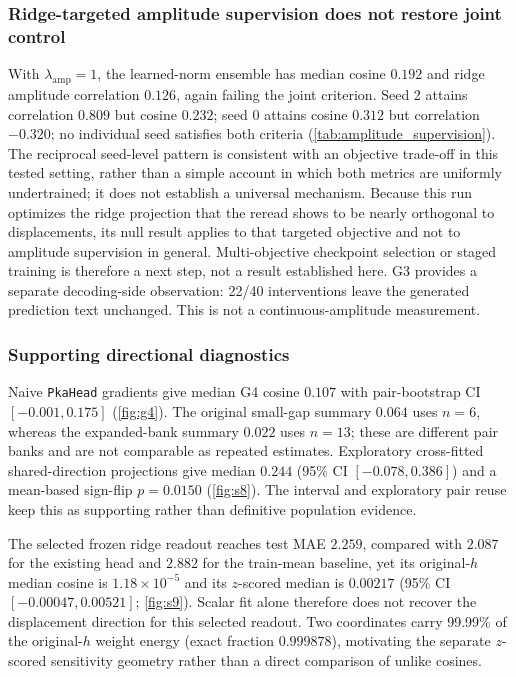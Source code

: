 \documentclass[11pt]{article}
\begin{document}
\subsubsection{Ridge-targeted amplitude supervision does not restore joint control} With $\lambda_{\mathrm{amp}}=1$, the learned-norm ensemble has median cosine $0.192$ and ridge amplitude correlation $0.126$, again failing the joint criterion. Seed 2 attains correlation $0.809$ but cosine $0.232$; seed 0 attains cosine $0.312$ but correlation $-0.320$; no individual seed satisfies both criteria (\cref{tab:amplitude_supervision}). The reciprocal seed-level pattern is consistent with an objective trade-off in this tested setting, rather than a simple account in which both metrics are uniformly undertrained; it does not establish a universal mechanism. Because this run optimizes the ridge projection that the reread shows to be nearly orthogonal to displacements, its null result applies to that targeted objective and not to amplitude supervision in general. Multi-objective checkpoint selection or staged training is therefore a next step, not a result established here. G3 provides a separate decoding-side observation: 22/40 interventions leave the generated prediction text unchanged. This is not a continuous-amplitude measurement.

\subsubsection{Supporting directional diagnostics} Naive \texttt{PkaHead} gradients give median G4 cosine $0.107$ with pair-bootstrap CI $[-0.001,0.175]$ (\cref{fig:g4}). The original small-gap summary $0.064$ uses $n=6$, whereas the expanded-bank summary $0.022$ uses $n=13$; these are different pair banks and are not comparable as repeated estimates. Exploratory cross-fitted shared-direction projections give median $0.244$ (95\% CI $[-0.078,0.386]$) and a mean-based sign-flip $p=0.0150$ (\cref{fig:s8}). The interval and exploratory pair reuse keep this as supporting rather than definitive population evidence.

The selected frozen ridge readout reaches test MAE $2.259$, compared with $2.087$ for the existing head and $2.882$ for the train-mean baseline, yet its original-$h$ median cosine is $1.18\times10^{-5}$ and its $z$-scored median is $0.00217$ (95\% CI $[-0.00047,0.00521]$; \cref{fig:s9}). Scalar fit alone therefore does not recover the displacement direction for this selected readout. Two coordinates carry 99.99\% of the original-$h$ weight energy (exact fraction $0.999878$), motivating the separate $z$-scored sensitivity geometry rather than a direct comparison of unlike cosines.
\end{document}
